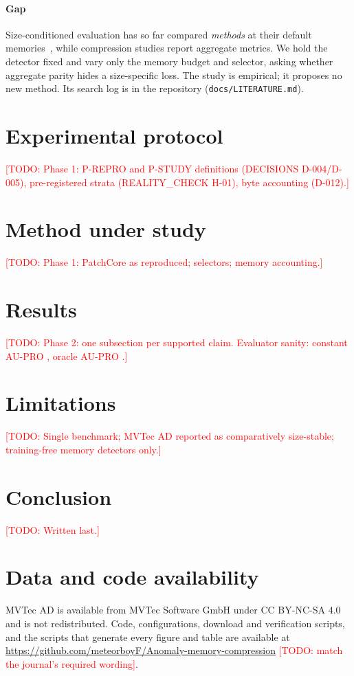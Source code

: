 \documentclass[preprint,review,12pt]{elsarticle}
\newcommand{\todo}[1]{\textcolor{red}{[TODO: #1]}}
\begin{document}
\paragraph{Gap}
Size-conditioned evaluation has so far compared \emph{methods} at their
default memories~\citep{costanzino2025pinpoint}, while compression studies
report aggregate metrics. We hold the detector fixed and vary only the
memory budget and selector, asking whether aggregate parity hides a
size-specific loss. The study is empirical; it proposes no new method. Its
search log is in the repository (\texttt{docs/LITERATURE.md}).

\section{Experimental protocol}\label{sec:protocol}
\todo{Phase 1: P-REPRO and P-STUDY definitions (DECISIONS D-004/D-005),
pre-registered strata (REALITY\_CHECK H-01), byte accounting (D-012).}

\begin{table}[t]
\centering
\caption{MVTec AD as profiled by our pipeline (generated from manifests).
Median defect area is the per-image native-resolution fraction.}
\label{tab:dataset}
\small

\end{table}

\section{Method under study}\label{sec:method}
\todo{Phase 1: PatchCore as reproduced; selectors; memory accounting.}

\section{Results}\label{sec:results}
\todo{Phase 2: one subsection per supported claim. Evaluator sanity:
constant AU-PRO \SanityConstantAUPRO, oracle AU-PRO \SanityOracleAUPRO.}

\section{Limitations}\label{sec:limitations}
\todo{Single benchmark; MVTec AD reported as comparatively size-stable;
training-free memory detectors only.}

\section{Conclusion}\label{sec:conclusion}
\todo{Written last.}

\section*{Data and code availability}
MVTec AD is available from MVTec Software GmbH under CC BY-NC-SA 4.0 and is
not redistributed. Code, configurations, download and verification scripts,
and the scripts that generate every figure and table are available at
\url{https://github.com/meteorboyF/Anomaly-memory-compression}
\todo{match the journal's required wording}.



\end{document}
